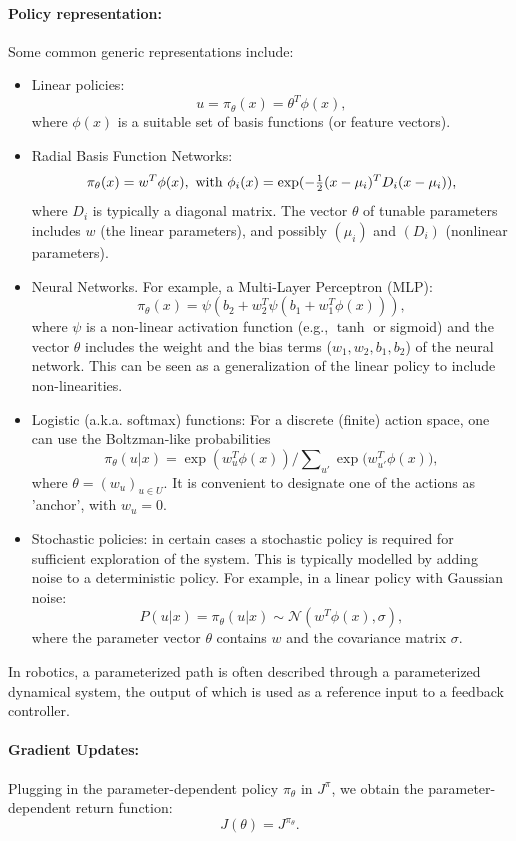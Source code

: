 \paragraph{Policy representation:} Some common generic representations include:
\begin{itemize}
  \item Linear policies:
                                      $$u = {\pi _\theta }(x) = {\theta ^T}\phi (x),$$
where $\phi (x)$ is a suitable set of basis functions (or  feature vectors).
  \item Radial Basis Function Networks:
             $${\pi _\theta }(x) = {w^T}\phi (x),  \textrm{ with }  {\phi _i}(x) = \exp ( - {\textstyle{1 \over 2}}{(x - {\mu _i})^T}{D_i}(x - {\mu _i})),$$
where ${D_i}$ is typically a diagonal matrix. The vector $\theta $ of tunable parameters includes $w$ (the linear parameters), and possibly $({\mu _i})$ and $({D_i})$ (nonlinear parameters).
  \item Neural Networks. For example, a Multi-Layer Perceptron (MLP):
  $$
    {\pi _\theta }(x) = \psi(b_2 + w_2^T \psi(b_1 + {w_1^T}\phi (x))),
  $$
  where $\psi$ is a non-linear activation function (e.g., $\tanh$ or sigmoid) and the vector $\theta$ includes the weight and the bias terms ($w_1,w_2,b_1,b_2$) of the neural network. This can be seen as a generalization of the linear policy to include non-linearities.
  \item Logistic (a.k.a. softmax) functions: For a discrete (finite) action space, one can use the Boltzman-like probabilities
                           $${\pi _\theta }(u|x) = \exp (w_u^T\phi (x))/\sum\nolimits_{u'} {\exp (w_{u'}^T\phi (x)} ),$$
where  $\theta  = {({w_u})_{u \in U}}$. It is convenient to designate one of the actions as 'anchor', with ${w_u} = 0$.
\item Stochastic policies: in certain cases a stochastic policy is required for sufficient exploration of the system. This is typically modelled by adding noise to a deterministic policy. For example, in a linear policy with Gaussian noise:
$$
P(u|x) = {\pi _\theta }(u|x) \sim \mathcal{N}\left( {w ^T}\phi (x), \sigma \right),
$$
where the parameter vector $\theta$ contains $w$ and the covariance matrix $\sigma$.
\end{itemize}

In robotics, a parameterized path is often described through a parameterized dynamical system, the output of which is used as a reference input to a feedback controller.

\paragraph{Gradient Updates:}  Plugging in the parameter-dependent policy ${\pi _\theta }$ in ${J^\pi }$,  we obtain the parameter-dependent return function:
\[J(\theta ) = {J^{{\pi _\theta }}}.\]

